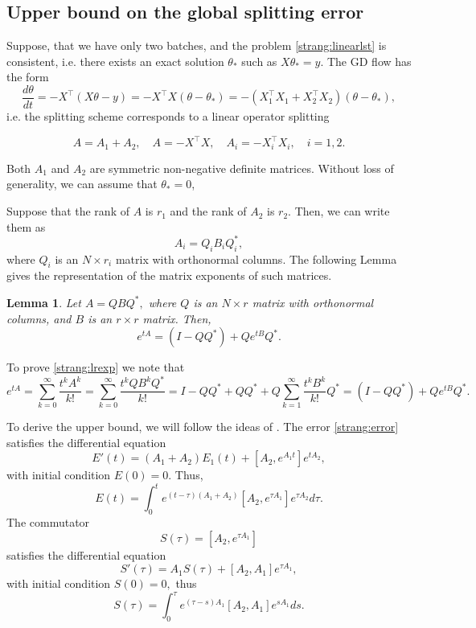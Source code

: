 \documentclass{article} %
\newtheorem{lemma}{Lemma}
\begin{document}
\subsection{Upper bound on the global splitting error}

Suppose, that we have only two batches, and the problem \eqref{strang:linearlst} is consistent, i.e. there exists an exact solution $\theta_*$ such as $X \theta_* = y$. The GD flow has the form
\begin{equation}\label{strang:model1}
    \frac{d \theta}{d t} = -X^{\top} (X \theta - y) = -X^{\top} X(\theta - \theta_*) = -(X_1^{\top} X_1 + X^{\top}_2 X_2)(\theta - \theta_*),
\end{equation}
i.e. the splitting scheme corresponds to a linear operator splitting

$$A = A_1 + A_2, \quad A = -X^{\top} X, \quad A_i = -X^{\top}_i X_i, \quad i = 1, 2.$$

Both $A_1$ and $A_2$ are symmetric non-negative definite matrices. Without loss of generality, we can assume that $\theta_* = 0$,

Suppose that the rank of $A$ is $r_1$ and the rank of $A_2$ is $r_2$. Then, we can write them as
$$A_i = Q_i B_i Q^*_i,$$
where $Q_i$ is an $N \times r_i$ matrix with orthonormal columns.  The following Lemma gives the representation of the matrix exponents of such matrices.
\begin{lemma}\label{strang:lemexp}
Let $A = Q B Q^*,$ where $Q$ is an $N \times r$ matrix with orthonormal columns, and $B$ is an $r \times r$ matrix. Then,
\begin{equation}\label{strang:lrexp}
    e^{t A}  = (I - QQ^*) + Q e^{t B} Q^*.
\end{equation}
\end{lemma}
To prove \eqref{strang:lrexp} we note that
$$e^{t A} = \sum_{k=0}^{\infty} \frac{t^k A^k}{k!} = \sum_{k=0}^{\infty} \frac{t^k Q B^k Q^*}{k!} =
I - QQ^* + QQ^* + Q \sum_{k=1}^{\infty} \frac{t^k B^k}{k!} Q^* = (I - QQ^*) + Q e^{t B} Q^*.
$$

To derive the upper bound, we will follow the ideas of \cite{sheng1994global}.
The error \eqref{strang:error} satisfies the differential equation
$$E'(t) = (A_1 + A_2) E_1(t) + [A_2, e^{A_1 t}] e^{t A_2}, $$
with initial condition $E(0) = 0.$
Thus,
\begin{equation}\label{strang:Erepr}
E(t) = \int^t_0 e^{(t-\tau)(A_1 + A_2)} [A_2, e^{\tau A_1}] e^{\tau A_2} d\tau.
\end{equation}
The commutator
$$S(\tau) = [A_2, e^{\tau A_1}]$$
satisfies the differential equation
$$
  S'(\tau) = A_1 S(\tau) + [A_2, A_1] e^{\tau A_1},
$$
with initial condition $S(0) = 0,$
thus
\begin{equation}\label{strang:Srepr}
S(\tau) = \int^{\tau}_0 e^{(\tau - s) A_1}[A_2, A_1] e^{s A_1} ds.
\end{equation}
\end{document}
